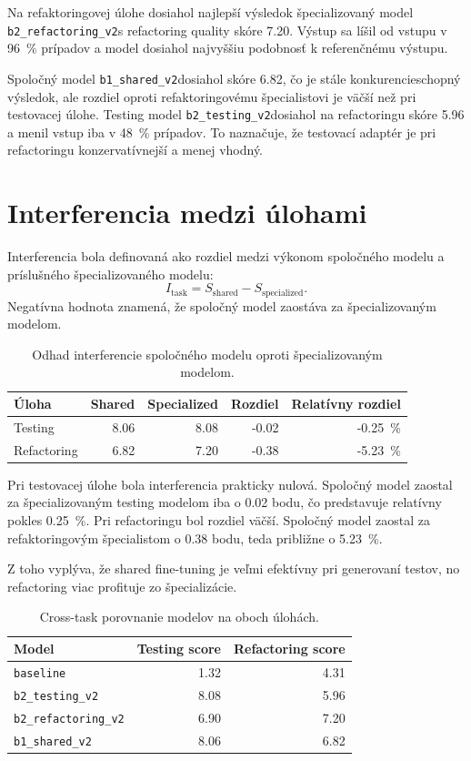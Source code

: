 \documentclass[11pt,a4paper]{article}
\newcommand{\modeltest}{\texttt{b2\_testing\_v2}}
\newcommand{\modelref}{\texttt{b2\_refactoring\_v2}}
\newcommand{\modelshared}{\texttt{b1\_shared\_v2}}
\begin{document}
Na refaktoringovej úlohe dosiahol najlepší výsledok špecializovaný model \modelref s refactoring quality skóre 7.20. Výstup sa líšil od vstupu v 96~\% prípadov a model dosiahol najvyššiu podobnosť k referenčnému výstupu.

Spoločný model \modelshared dosiahol skóre 6.82, čo je stále konkurencieschopný výsledok, ale rozdiel oproti refaktoringovému špecialistovi je väčší než pri testovacej úlohe. Testing model \modeltest dosiahol na refactoringu skóre 5.96 a menil vstup iba v 48~\% prípadov. To naznačuje, že testovací adaptér je pri refactoringu konzervatívnejší a menej vhodný.

\section{Interferencia medzi úlohami}

Interferencia bola definovaná ako rozdiel medzi výkonom spoločného modelu a príslušného špecializovaného modelu:
\begin{equation}
I_{\text{task}} = S_{\text{shared}} - S_{\text{specialized}}.
\end{equation}
Negatívna hodnota znamená, že spoločný model zaostáva za špecializovaným modelom.

\begin{table}[h]
\centering
\begin{tabular}{lrrrr}
\toprule
Úloha & Shared & Specialized & Rozdiel & Relatívny rozdiel \\
\midrule
Testing & 8.06 & 8.08 & -0.02 & -0.25~\% \\
Refactoring & 6.82 & 7.20 & -0.38 & -5.23~\% \\
\bottomrule
\end{tabular}
\caption{Odhad interferencie spoločného modelu oproti špecializovaným modelom.}
\label{tab:interference}
\end{table}

Pri testovacej úlohe bola interferencia prakticky nulová. Spoločný model zaostal za špecializovaným testing modelom iba o 0.02 bodu, čo predstavuje relatívny pokles 0.25~\%. Pri refactoringu bol rozdiel väčší. Spoločný model zaostal za refaktoringovým špecialistom o 0.38 bodu, teda približne o 5.23~\%.

Z toho vyplýva, že shared fine-tuning je veľmi efektívny pri generovaní testov, no refactoring viac profituje zo špecializácie.

\begin{table}[h]
\centering
\begin{tabular}{lrr}
\toprule
Model & Testing score & Refactoring score \\
\midrule
\texttt{baseline} & 1.32 & 4.31 \\
\modeltest & 8.08 & 5.96 \\
\modelref & 6.90 & 7.20 \\
\modelshared & 8.06 & 6.82 \\
\bottomrule
\end{tabular}
\caption{Cross-task porovnanie modelov na oboch úlohách.}
\label{tab:cross-task}
\end{table}
\end{document}
